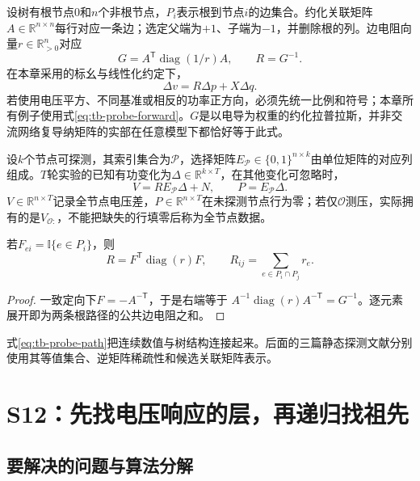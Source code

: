 设树有根节点0和$n$个非根节点，$P_i$表示根到节点$i$的边集合。约化关联矩阵$A\in\mathbb R^{n\times n}$每行对应一条边；选定父端为$+1$、子端为$-1$，并删除根的列。边电阻向量$r\in\mathbb R^n_{>0}$对应
\[
 G=A^{\mathsf T}\operatorname{diag}(1/r)A,\qquad R=G^{-1}.
\]
在本章采用的标幺与线性化约定下，
\begin{equation}
 \Delta v=R\Delta p+X\Delta q.
 \label{eq:tb-probe-forward}
\end{equation}
若使用电压平方、不同基准或相反的功率正方向，必须先统一比例和符号；本章所有例子使用式\eqref{eq:tb-probe-forward}。$G$是以电导为权重的约化拉普拉斯，并非交流网络复导纳矩阵的实部在任意模型下都恰好等于此式。

设$k$个节点可探测，其索引集合为$\mathcal P$，选择矩阵$E_{\mathcal P}\in\{0,1\}^{n\times k}$由单位矩阵的对应列组成。$T$轮实验的已知有功变化为$\Delta\in\mathbb R^{k\times T}$，在其他变化可忽略时，
\begin{equation}
 V=RE_{\mathcal P}\Delta+N,\qquad P=E_{\mathcal P}\Delta.
 \label{eq:tb-probe-data}
\end{equation}
$V\in\mathbb R^{n\times T}$记录全节点电压差，$P\in\mathbb R^{n\times T}$在未探测节点行为零；若仅$\mathcal O$测压，实际拥有的是$V_{\mathcal O:}$，不能把缺失的行填零后称为全节点数据。

\begin{proposition}
若$F_{ei}=\mathbb I\{e\in P_i\}$，则
\begin{equation}
 R=F^{\mathsf T}\operatorname{diag}(r)F,\qquad
 R_{ij}=\sum_{e\in P_i\cap P_j}r_e.
 \label{eq:tb-probe-path}
\end{equation}
\end{proposition}
\begin{proof}
一致定向下$F=-A^{-\mathsf T}$，于是右端等于
$A^{-1}\operatorname{diag}(r)A^{-\mathsf T}=G^{-1}$。逐元素展开即为两条根路径的公共边电阻之和。
\end{proof}
式\eqref{eq:tb-probe-path}把连续数值与树结构连接起来。后面的三篇静态探测文献分别使用其等值集合、逆矩阵稀疏性和候选关联矩阵表示。

\section{S12：先找电压响应的层，再递归找祖先}
\label{sec:tb-S12}

\subsection{要解决的问题与算法分解}

